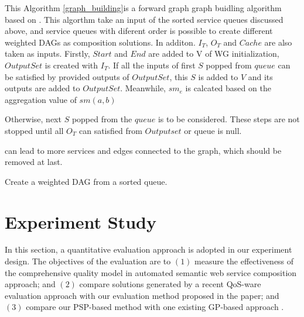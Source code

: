 \documentclass{llncs}
\begin{document}
This Algorithm  \ref{graph_building}is a forward graph graph buidling algorithm based on \cite{blum1997fast}. This algorthm take an input of the sorted service queues discussed above, and service queues with diferent order is possible to create different weighted DAGs as composition solutions. In additon. $I_{T}$, $O_{T}$ and $Cache$ are also taken as inputs. Firstly, $Start$ and $End$ are added to V of WG initialization, $OutputSet$ is created with $I_{T}$.  If all the inputs of first $S$ popped from $queue$ can be satisfied by provided outputs of $OutputSet$, this $S$ is added to $V$ and its outputs are added to $OutputSet$. Meanwhile, $sm_{e}$ is calcated based on the aggregation value of $sm(a, b)$



Otherwise,  next $S$ popped from the $queue$ is to be considered. These steps are not stopped until all  $O_{T}$ can satisfied from $Outputset$ or queue is null.






can lead to more services and edges connected to the graph, which should be removed at last.

\begin{algorithm}
 \SetNlSty{}{}{:}
 \caption{Create a weighted DAG from a  sorted queue.}
\label{graph_building}
\end{algorithm} 


\section{Experiment Study}\label{experiment_design}
In this section, a quantitative evaluation approach is adopted in our experiment design. The objectives of the evaluation are to $(1)$ measure the effectiveness of the comprehensive quality model in automated semantic web service composition approach; and $(2)$ compare solutions generated by a recent QoS-ware evaluation approach \cite{ma2015hybrid,da2016genetic} with our evaluation method proposed in the paper; and $(3)$ compare our PSP-based method with one existing GP-based approach \cite{ma2015hybrid}.
\end{document}
